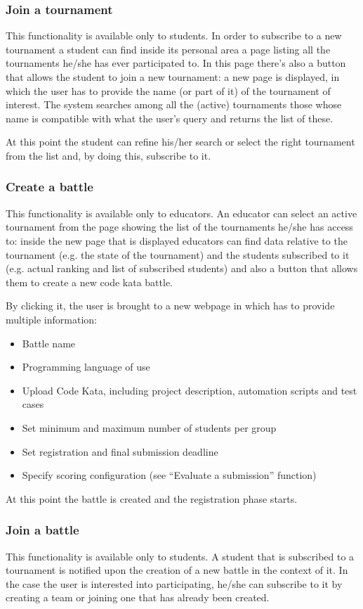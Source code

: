 \subsubsection{Join a tournament}
This functionality is available only to students. In order to subscribe to a new tournament a student can find inside its personal area a page listing all the tournaments he/she has ever participated to. In this page there’s also a button that allows the student to join a new tournament: a new page is displayed, in which the user has to provide the name (or part of it) of the tournament of interest. The system searches among all the (active) tournaments those whose name is compatible with what the user’s query and returns the list of these.

At this point the student can refine his/her search or select the right tournament from the list and, by doing this, subscribe to it.
\subsubsection{Create a battle}
This functionality is available only to educators. An educator can select an active tournament from the page showing the list of the tournaments he/she has access to: inside the new page that is displayed educators can find data relative to the tournament (e.g. the state of the tournament) and the students subscribed to it (e.g. actual ranking and list of subscribed students) and also a button that allows them to create a new code kata battle.

By clicking it, the user is brought to a new webpage in which has to provide multiple information:
\begin{itemize}
    \item Battle name
    \item Programming language of use
    \item Upload Code Kata, including project description, automation scripts and test cases
    \item Set minimum and maximum number of students per group
    \item Set registration and final submission deadline
    \item Specify scoring configuration (see “Evaluate a submission” function)
\end{itemize}
At this point the battle is created and the registration phase starts.
\subsubsection{Join a battle}
This functionality is available only to students. A student that is subscribed to a tournament is notified upon the creation of a new battle in the context of it. In the case the user is interested into participating, he/she can subscribe to it by creating a team or joining one that has already been created.

